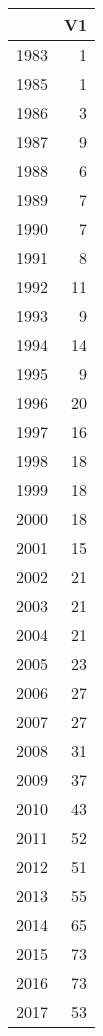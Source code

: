 \begin{table}[ht]
\centering
\begin{tabular}{rr}
  \hline
 & V1 \\ 
  \hline
1983 &   1 \\ 
  1985 &   1 \\ 
  1986 &   3 \\ 
  1987 &   9 \\ 
  1988 &   6 \\ 
  1989 &   7 \\ 
  1990 &   7 \\ 
  1991 &   8 \\ 
  1992 &  11 \\ 
  1993 &   9 \\ 
  1994 &  14 \\ 
  1995 &   9 \\ 
  1996 &  20 \\ 
  1997 &  16 \\ 
  1998 &  18 \\ 
  1999 &  18 \\ 
  2000 &  18 \\ 
  2001 &  15 \\ 
  2002 &  21 \\ 
  2003 &  21 \\ 
  2004 &  21 \\ 
  2005 &  23 \\ 
  2006 &  27 \\ 
  2007 &  27 \\ 
  2008 &  31 \\ 
  2009 &  37 \\ 
  2010 &  43 \\ 
  2011 &  52 \\ 
  2012 &  51 \\ 
  2013 &  55 \\ 
  2014 &  65 \\ 
  2015 &  73 \\ 
  2016 &  73 \\ 
  2017 &  53 \\ 
   \hline
\end{tabular}
\end{table}
